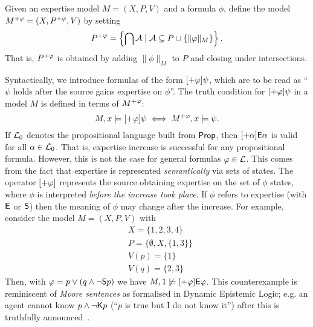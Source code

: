 \begin{definition}
\label{exp_def_expinc_model}
Given an expertise model $M = (X, P, V)$ and a formula $\phi$,
define the model $M^{\expinc\phi} = (X, P^{\expinc\phi}, V)$ by
setting
\[
P^{\expinc\phi}
=
\left\{\bigcap \mathcal{A} \mid \mathcal{A} \subseteq P \cup \{\|\phi\|_M\}\right\}.
\]
That is, $P^{\expinc\phi}$ is obtained by adding
$\|\phi\|_M$ to $P$ and closing under intersections.

\end{definition}

Syntactically, we introduce formulas of the form $[\expinc\phi]\psi$,
which are to be read as ``$\psi$ holds after the source gains expertise on
$\phi$''. The truth condition for $[\expinc\phi]\psi$ in a model
$M$ is defined in terms of $M^{\expinc\phi}$:
\[
M, x \models [\expinc\phi]\psi
\iff
M^{\expinc\phi}, x \models \psi.\]
If $\cLzero$ denotes the propositional language built from $\Prop$,
then $[\expinc\alpha]\E\alpha$ is valid for all $\alpha \in
\cLzero$. That is, expertise increase is successful for any propositional
formula. However, this is not the case for general formulas $\phi \in
\cL$. This comes from the fact that expertise is represented \emph{semantically} via
sets of states. The operator $[\expinc\phi]$ represents the source
obtaining expertise on the set of $\phi$ states, where $\phi$ is
interpreted \emph{before the increase took place}. If $\phi$ refers to
expertise (with $\E$ or $\S$) then the meaning of $\phi$ may
change after the increase. For example, consider the model $M = (X, P,
V)$ with
\[
\begin{aligned}
    &X = \{1, 2, 3, 4\} \\
    &P = \{\emptyset, X, \{1, 3\}\} \\
    &V(p) = \{1\} \\
    &V(q) = \{2, 3\}
\end{aligned}\]
Then, with $\phi = p \lor (q \land \neg\S p)$ we have $M, 1 \not\models
[\expinc\phi]\E\phi$.\footnotemark{} This counterexample is reminiscent of
\emph{Moore sentences} as formalised in Dynamic Epistemic Logic; e.g. an agent
cannot know $p \land \neg\K p$ (``$p$ is true but I do not know it'') after this
is truthfully announced~\cite{baltag2008qualitative}.


